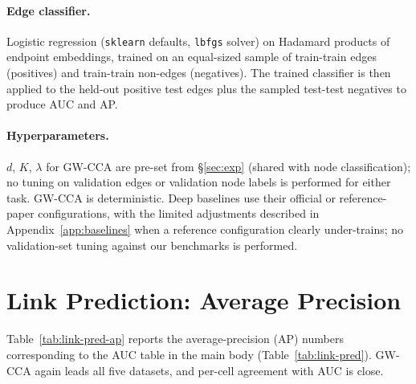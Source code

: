 \documentclass{article}
\begin{document}
\paragraph{Edge classifier.}
Logistic regression (\texttt{sklearn} defaults, \texttt{lbfgs} solver) on
Hadamard products of endpoint embeddings, trained on an equal-sized
sample of train-train edges (positives) and train-train non-edges
(negatives). The trained classifier is then applied to the held-out
positive test edges plus the sampled test-test negatives to produce AUC
and AP.

\paragraph{Hyperparameters.}
$d$, $K$, $\lambda$ for GW-CCA are pre-set from \S\ref{sec:exp} (shared
with node classification); no tuning on validation edges or validation
node labels is performed for either task. GW-CCA is deterministic.
Deep baselines use their official or reference-paper
configurations, with the limited adjustments described in
Appendix~\ref{app:baselines} when a reference configuration clearly
under-trains; no validation-set tuning against our benchmarks is
performed.

\section{Link Prediction: Average Precision}
\label{app:link-pred-ap}

Table~\ref{tab:link-pred-ap} reports the average-precision (AP) numbers
corresponding to the AUC table in the main body
(Table~\ref{tab:link-pred}). GW-CCA again leads all five datasets, and
per-cell agreement with AUC is close.
\end{document}
